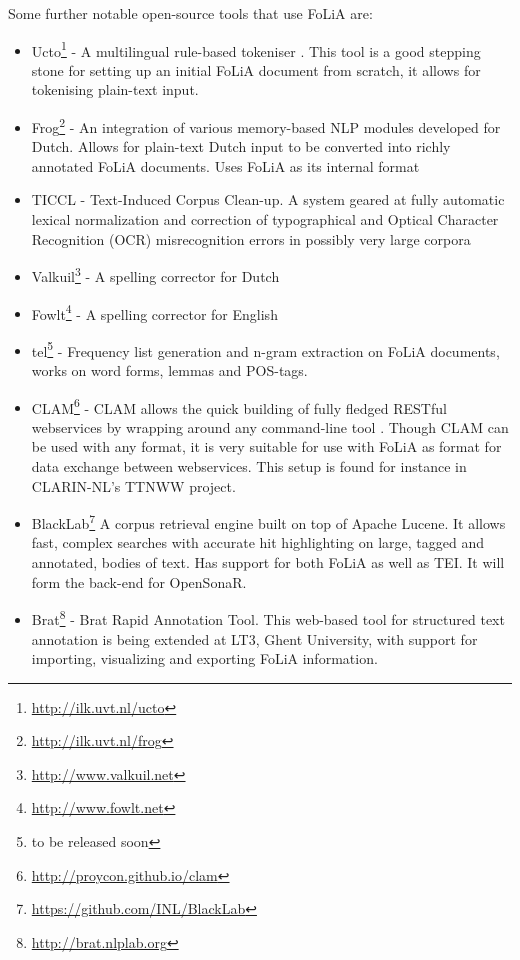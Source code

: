 \documentclass[a4paper,10pt,twoside]{article}
\begin{document}
Some further notable open-source tools that use FoLiA are:

\begin{itemize}
  \item Ucto\footnote{\url{http://ilk.uvt.nl/ucto}} - A multilingual rule-based
    tokeniser \cite{UCTO}. This tool is a good stepping stone for setting up an initial
    FoLiA document from scratch, it allows for  tokenising plain-text input.
  \item Frog\footnote{\url{http://ilk.uvt.nl/frog}} - An integration of various memory-based NLP modules developed for Dutch. Allows for plain-text Dutch input to be converted into richly
  annotated FoLiA documents. Uses FoLiA as its internal format
 \item TICCL - Text-Induced Corpus Clean-up. A system geared at fully automatic lexical normalization and correction of typographical and Optical Character Recognition (OCR) misrecognition errors in possibly very large corpora \cite{Reynaert2010}
 \item Valkuil\footnote{\url{http://www.valkuil.net}} - A spelling corrector for Dutch
 \item Fowlt\footnote{\url{http://www.fowlt.net}} - A spelling corrector for English
 \item tel\footnote{to be released soon} - Frequency list generation and n-gram
   extraction on FoLiA documents, works on word forms, lemmas and POS-tags.
 \item CLAM\footnote{\url{http://proycon.github.io/clam}} - CLAM allows the quick
   building of fully fledged RESTful webservices by wrapping around any
   command-line tool \cite{CLAM}. Though CLAM can be used with any format, it
   is very suitable for use with FoLiA as format for data exchange between
   webservices. This setup is found for instance in CLARIN-NL's TTNWW project. 
 \item BlackLab\footnote{\url{https://github.com/INL/BlackLab}} A corpus retrieval
   engine built on top of Apache Lucene. It allows fast, complex searches with
   accurate hit highlighting on large, tagged and annotated, bodies of text.
   Has support for both FoLiA as well as TEI. It will form the back-end for OpenSonaR.
 \item Brat\footnote{\url{http://brat.nlplab.org}} - Brat Rapid Annotation
   Tool. This web-based tool for structured text annotation is being extended at LT3, Ghent University, with support for importing, visualizing and exporting FoLiA information.
 \end{itemize}
\end{document}
